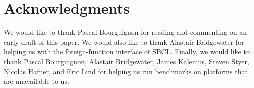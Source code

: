 \section{Acknowledgments}

We would like to thank Pascal Bourguignon for reading and commenting
on an early draft of this paper.  We would also like to thank Alastair
Bridgewater for helping us with the foreign-function interface of
SBCL.  Finally, we would like to thank Pascal Bourguignon, Alastair
Bridgewater, James Kalenius, Steven Styer, Nicolas Hafner, and Eric
Lind for helping us run benchmarks on platforms that are unavailable
to us.

